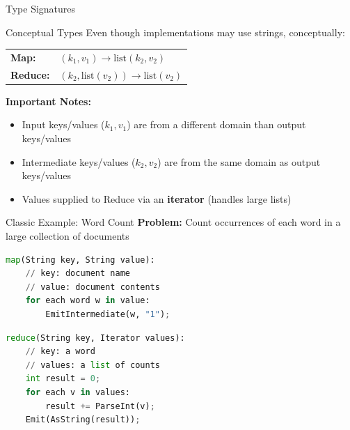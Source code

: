 \documentclass[aspectratio=169]{beamer}
\begin{document}
\begin{frame}{Type Signatures}
\begin{block}{Conceptual Types}
Even though implementations may use strings, conceptually:

\vspace{0.3cm}

\centering
\begin{tabular}{ll}
\textbf{Map:} & $(k_1, v_1) \rightarrow \text{list}(k_2, v_2)$ \\[0.3cm]
\textbf{Reduce:} & $(k_2, \text{list}(v_2)) \rightarrow \text{list}(v_2)$ \\
\end{tabular}
\end{block}

\vspace{0.5cm}

\textbf{Important Notes:}
\begin{itemize}
    \item Input keys/values ($k_1, v_1$) are from a \alert{different domain} than output keys/values
    \item Intermediate keys/values ($k_2, v_2$) are from the \alert{same domain} as output keys/values
    \item Values supplied to Reduce via an \textbf{iterator} (handles large lists)
\end{itemize}
\end{frame}

\begin{frame}[fragile]{Classic Example: Word Count}
\textbf{Problem:} Count occurrences of each word in a large collection of documents

\vspace{0.3cm}

\begin{lstlisting}[language=Python, caption=Map Function]
map(String key, String value):
    // key: document name
    // value: document contents
    for each word w in value:
        EmitIntermediate(w, "1");
\end{lstlisting}

\vspace{0.2cm}

\begin{lstlisting}[language=Python, caption=Reduce Function]
reduce(String key, Iterator values):
    // key: a word
    // values: a list of counts
    int result = 0;
    for each v in values:
        result += ParseInt(v);
    Emit(AsString(result));
\end{lstlisting}
\end{frame}
\end{document}
